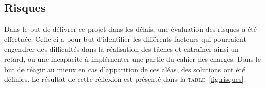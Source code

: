 

	\subsection{Risques}
		\label{subsec:risques}



    Dans le but de délivrer ce projet dans les délais, une évaluation des risques a été effectuée. Celle-ci a pour but d'identifier les différents facteurs qui pourraient engendrer des difficultés dans la réalisation des tâches et entraîner ainsi un retard, ou une incapacité à implémenter une partie du cahier des charges. Dans le but de réagir au mieux en cas d’apparition de ces aléas, des solutions ont été définies. Le résultat de cette réflexion est présenté dans la \textsc{table}~\ref{fig:risques}.


